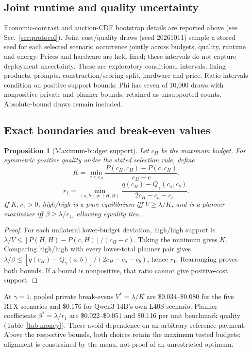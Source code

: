 \documentclass[sigconf,anonymous,nonacm]{acmart}
\newtheorem{proposition}{Proposition}
\begin{document}
\subsection{Joint runtime and quality uncertainty}
Economic-contrast and auction-CDF bootstrap details are reported above (see Sec.~\ref{sec:protocol}). Joint cost/quality draws (seed 20261011) sample a stored seed for each selected scenario occurrence jointly across budgets, quality, runtime and energy. Prices and hardware are held fixed; these intervals do not capture deployment uncertainty. These are exploratory conditional intervals, fixing products, prompts, construction/scoring split, hardware and price. Ratio intervals condition on positive support bounds: Phi has seven of 10,000 draws with nonpositive private and planner bounds, retained as unsupported counts. Absolute-bound draws remain included.

\subsection{Exact boundaries and break-even values}\label{sec:allocation}
\begin{proposition}[Maximum-budget support]\label{prop:maxsupport}
Let $c_H$ be the maximum budget. For symmetric positive quality under the stated selection rule, define
\[
K=\min_{c<c_H}\frac{P(c_H,c_H)-P(c,c_H)}{c_H-c}.\]
\[
r_1=\min_{(a,b)\ne(H,H)}\frac{q(c_H)-Q_\gamma(c_a,c_b)}{2c_H-c_a-c_b}.
\]
If $K,r_1>0$, high/high is a pure equilibrium iff $V\geq\lambda/K$, and is a planner maximizer iff $\beta\geq\lambda/r_1$, allowing equality ties.
\end{proposition}
\begin{proof}
For each unilateral lower-budget deviation, high/high support is $\lambda/V\leq[P(H,H)-P(c,H)]/(c_H-c)$. Taking the minimum gives $K$. Comparing high/high with every lower-total planner pair gives $\lambda/\beta\leq[q(c_H)-Q_\gamma(a,b)]/(2c_H-c_a-c_b)$, hence $r_1$. Rearranging proves both bounds. If a bound is nonpositive, that ratio cannot give positive-cost support.
\end{proof}
At $\gamma=1$, pooled private break-evens $V^*=\lambda/K$ are \$0.034--\$0.080 for the five RTX scenarios and \$0.176 for Qwen3-14B's own L40S scenario. Planner coefficients $\beta^*=\lambda/r_1$ are \$0.022--\$0.051 and \$0.116 per unit benchmark quality (Table~\ref{tab:money}). These avoid dependence on an arbitrary reference payment. Above the respective bounds, both choices retain the maximum tested budgets; alignment is constrained by the menu, not proof of an unrestricted optimum.
\end{document}
